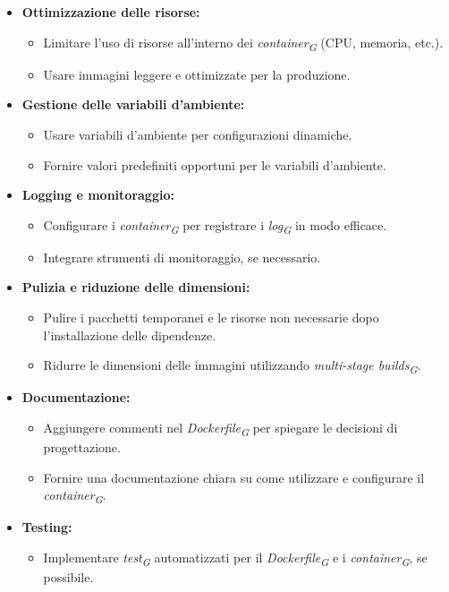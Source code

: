 \begin{itemize}
\item \textbf{Ottimizzazione delle risorse:}
    \begin{itemize}
        \item Limitare l'uso di risorse all'interno dei \textit{container}\textsubscript{\textit{G}} (CPU, memoria, etc.).
        \item Usare immagini leggere e ottimizzate per la produzione.
    \end{itemize}

\item \textbf{Gestione delle variabili d'ambiente:}
    \begin{itemize}
        \item Usare variabili d'ambiente per configurazioni dinamiche.
        \item Fornire valori predefiniti opportuni per le variabili d'ambiente.
    \end{itemize}
\pagebreak

\item \textbf{Logging e monitoraggio:}
    \begin{itemize}
        \item Configurare i \textit{container}\textsubscript{\textit{G}} per registrare i \textit{log}\textsubscript{\textit{G}} in modo efficace.
        \item Integrare strumenti di monitoraggio, se necessario.
    \end{itemize}

\item \textbf{Pulizia e riduzione delle dimensioni:}
    \begin{itemize}
        \item Pulire i pacchetti temporanei e le risorse non necessarie dopo l'installazione delle dipendenze.
        \item Ridurre le dimensioni delle immagini utilizzando \textit{multi-stage builds}\textsubscript{\textit{G}}.
    \end{itemize}

\item \textbf{Documentazione:}
    \begin{itemize}
        \item Aggiungere commenti nel \textit{Dockerfile}\textsubscript{\textit{G}} per spiegare le decisioni di progettazione.
        \item Fornire una documentazione chiara su come utilizzare e configurare il \textit{container}\textsubscript{\textit{G}}.
    \end{itemize}

\item \textbf{Testing:}
    \begin{itemize}
        \item Implementare \textit{test}\textsubscript{\textit{G}} automatizzati per il \textit{Dockerfile}\textsubscript{\textit{G}} e i \textit{container}\textsubscript{\textit{G}}, se possibile.
    \end{itemize}
\end{itemize}
